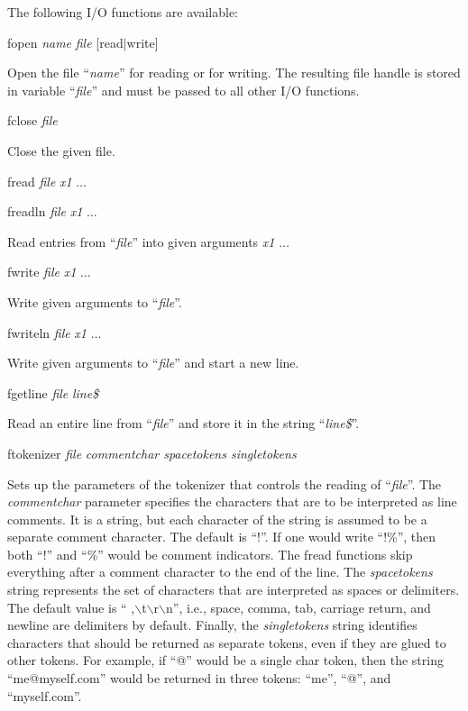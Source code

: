 The following I/O functions are available:

\begin{commanddescription}
\item[{\sf fopen {\it name} {\it file} [read$|$write]}]

Open the file ``{\it name}'' for reading or for writing. The resulting file handle is stored in variable ``{\it file}'' and must be passed to all other I/O functions.

\item[{\sf fclose {\it file}}]

Close the given file.

\item[{\sf fread {\it file} {\it x1} $\ldots$}]
\item[{\sf freadln {\it file} {\it x1} $\ldots$}]

Read entries from ``{\it file}'' into given arguments {\it x1} $\ldots$

\item[{\sf fwrite {\it file} {\it x1} $\ldots$}]

Write given arguments to ``{\it file}''.

\item[{\sf fwriteln {\it file} {\it x1} $\ldots$}]

Write given arguments to ``{\it file}'' and start a new line.

\item[{\sf fgetline {\it file} {\it line\$}}]

Read an entire line from ``{\it file}'' and store it in the string ``{\it line\$}''.

\item[{\sf ftokenizer {\it file} {\it commentchar spacetokens singletokens}}]

Sets up the parameters of the tokenizer that controls the reading of ``{\it file}''. The {\it commentchar} parameter specifies the characters that are to be interpreted as line comments. It is a string, but each character of the string is assumed to be a separate comment character. The default is ``!''. If one would write ``!\%'', then both ``!'' and ``\%'' would be comment indicators. The {\sf fread} functions skip everything after a comment character to the end of the line. The {\it spacetokens} string represents the set of characters that are interpreted as spaces or delimiters. The default value is `` ,$\backslash$t$\backslash$r$\backslash$n'', i.e., space, comma, tab, carriage return, and newline are delimiters by default. Finally, the {\it singletokens} string identifies characters that should be returned as separate tokens, even if they are glued to other tokens. For example, if ``@'' would be a single char token, then the string ``me@myself.com'' would be returned in three tokens: ``me'', ``@'', and ``myself.com''. 

\end{commanddescription}

